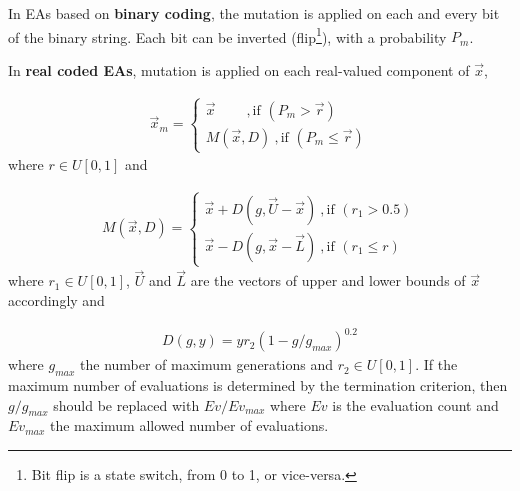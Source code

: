 In EAs based on {\bf binary coding}, the mutation is applied on each and every bit of the binary string. Each bit can be inverted (flip\footnote{Bit flip is a state switch, from 0 to 1, or vice-versa.}), with a probability $P_m$.      

\begin{figure}[h!]
\begin{minipage}[b]{1\linewidth}
 \centering
\end{minipage}
\label{binarymut}
\end{figure}

\pagebreak
In {\bf real coded EAs},  mutation is applied on each real-valued component of $\vec{x}$, 

\begin{eqnarray}
	\vec{x}_m={\left\{ 
	\begin{array}{ll}
    \vec{x}~~~~~~~~~~,\mbox{if $(P_m > \vec{r})$}\\
	M(\vec{x},D)~,\mbox{if $(P_m \leq \vec{r})$}
    \end{array} \right. }
    \label{}
\end{eqnarray}
where $r\in U[0,1]$ and

\begin{eqnarray}
	M(\vec{x},D)={\left\{ 
	\begin{array}{ll}
    \vec{x}+D(g,\vec{U}-\vec{x})~,\mbox{if $(r_1 > 0.5)$}\\
	\vec{x}-D(g,\vec{x}-\vec{L})~,\mbox{if $(r_1 \leq r)$}
    \end{array} \right. }
    \label{}
\end{eqnarray}
where $r_1\in U[0,1]$, $\vec{U}$ and $\vec{L}$ are the vectors of upper and lower bounds of $\vec{x}$ accordingly and  

\begin{eqnarray}
   D(g,y) = y r_2 (1-g/g_{max})^{0.2}
\end{eqnarray}
where $g_{max}$ the number of maximum generations and $r_2\in U[0,1]$. If the maximum number of evaluations is determined by the termination criterion, then $g/g_{max}$ should be replaced with $Ev/Ev_{max}$ where $Ev$ is the evaluation count and $Ev_{max}$ the maximum allowed number of evaluations.  



